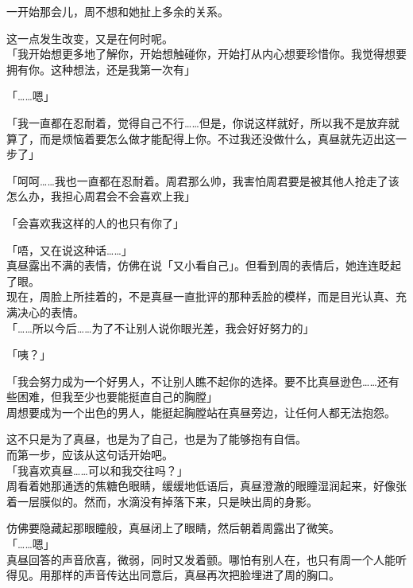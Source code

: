 一开始那会儿，周不想和她扯上多余的关系。

这一点发生改变，又是在何时呢。\\

「我开始想更多地了解你，开始想触碰你，开始打从内心想要珍惜你。我觉得想要拥有你。这种想法，还是我第一次有」

「……嗯」

「我一直都在忍耐着，觉得自己不行……但是，你说这样就好，所以我不是放弃就算了，而是烦恼着要怎么做才能配得上你。不过我还没做什么，真昼就先迈出这一步了」

「呵呵……我也一直都在忍耐着。周君那么帅，我害怕周君要是被其他人抢走了该怎么办，我担心周君会不会喜欢上我」

「会喜欢我这样的人的也只有你了」

「唔，又在说这种话……」\\

真昼露出不满的表情，仿佛在说「又小看自己」。但看到周的表情后，她连连眨起了眼。\\

现在，周脸上所挂着的，不是真昼一直批评的那种丢脸的模样，而是目光认真、充满决心的表情。\\

「……所以今后……为了不让别人说你眼光差，我会好好努力的」

「咦？」

「我会努力成为一个好男人，不让别人瞧不起你的选择。要不比真昼逊色……还有些困难，但我至少也要能挺直自己的胸膛」\\

周想要成为一个出色的男人，能挺起胸膛站在真昼旁边，让任何人都无法抱怨。

这不只是为了真昼，也是为了自己，也是为了能够抱有自信。\\

而第一步，应该从这句话开始吧。\\

「我喜欢真昼……可以和我交往吗？」\\

周看着她那通透的焦糖色眼睛，缓缓地低语后，真昼澄澈的眼瞳湿润起来，好像张着一层膜似的。然而，水滴没有掉落下来，只是映出周的身影。

仿佛要隐藏起那眼瞳般，真昼闭上了眼睛，然后朝着周露出了微笑。\\

「……嗯」\\

真昼回答的声音欣喜，微弱，同时又发着颤。哪怕有别人在，也只有周一个人能听得见。用那样的声音传达出同意后，真昼再次把脸埋进了周的胸口。

